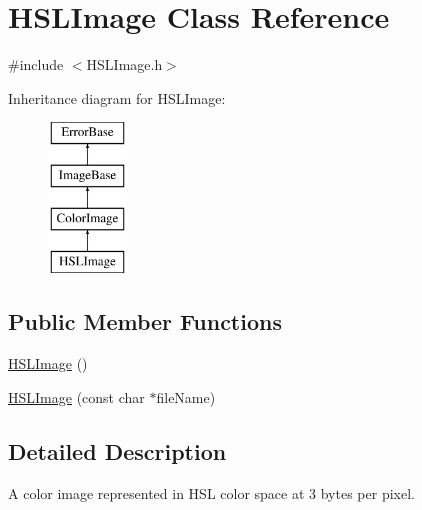 \hypertarget{classHSLImage}{
\section{HSLImage Class Reference}
\label{classHSLImage}
}


{\ttfamily \#include $<$HSLImage.h$>$}

Inheritance diagram for HSLImage:\begin{figure}[H]
\begin{center}
\leavevmode
\includegraphics[height=4.000000cm]{classHSLImage}
\end{center}
\end{figure}
\subsection*{Public Member Functions}
\begin{DoxyCompactItemize}
\item 
\hyperlink{classHSLImage_ad3ec4d350820355397548e2dd24383e6}{HSLImage} ()
\item 
\hyperlink{classHSLImage_a9affa2b4ac07190d5af644c111806195}{HSLImage} (const char $\ast$fileName)
\end{DoxyCompactItemize}


\subsection{Detailed Description}
A color image represented in HSL color space at 3 bytes per pixel. 

